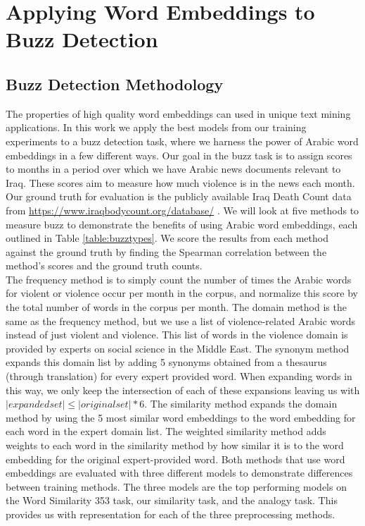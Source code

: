 \chapter{Applying Word Embeddings to Buzz Detection}
\label{sec:buzz}

\section{Buzz Detection Methodology}

The properties of high quality word embeddings can used in unique text mining applications. In this work we apply the best models from our training experiments to a buzz detection task, where we harness the power of Arabic word embeddings in a few different ways. Our goal in the buzz task is to assign scores to months in a period over which we have Arabic news documents relevant to Iraq. These scores aim to measure how much violence is in the news each month. Our ground truth for evaluation is the publicly available Iraq Death Count data from \url{https://www.iraqbodycount.org/database/} \cite{IraqB68:online}. We will look at five methods to measure buzz to demonstrate the benefits of using Arabic word embeddings, each outlined in Table \ref{table:buzztypes}. We score the results from each method against the ground truth by finding the Spearman correlation between the method's scores and the ground truth counts. 
\\
The frequency method is to simply count the number of times the Arabic words for violent or violence occur per month in the corpus, and normalize this score by the total number of words in the corpus per month. The domain method is the same as the frequency method, but we use a list of violence-related Arabic words instead of just violent and violence. This list of words in the violence domain is provided by experts on social science in the Middle East. The synonym method expands this domain list by adding 5 synonyms obtained from a thesaurus (through translation) for every expert provided word. When expanding words in this way, we only keep the intersection of each of these expansions leaving us with $|expanded set| \leq |original set| * 6$. The similarity method expands the domain method by using the 5 most similar word embeddings to the word embedding for each word in the expert domain list. The weighted similarity method adds weights to each word in the similarity method by how similar it is to the word embedding for the original expert-provided word. Both methods that use word embeddings are evaluated with three different models to demonstrate differences between training methods. The three models are the top performing models on the Word Similarity 353 task, our similarity task, and the analogy task. This provides us with representation for each of the three preprocessing methods.

